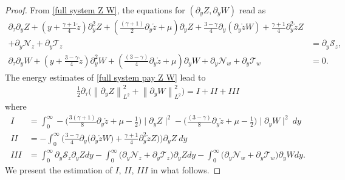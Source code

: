 \documentclass{article}
\newcommand{\norm}[1]{\left\lVert#1\right\rVert}
\newcommand{\ga}{\gamma}
\newcommand{\pa}{\partial}
\def\beqa{\begin{equation}\begin{aligned}}
\def\eeqa{\end{aligned}\end{equation}}
\def\espz{Z}
\def\espw{W}
\def\nz{\mathcal N_z}
\def\nw{\mathcal N_w}
\def\nmz{\mathcal T_z}
\def\nmw{\mathcal T_w}
\numberwithin{equation}{section}
\begin{document}
\begin{proof} 
From \eqref{full system Z W}, the equations for $(\pa_y Z, \pa_y W)$ read as  
	\beqa\label{full system pay Z W}
	\partial_\tau\pa_y \espz + (y+\frac{\ga+1}{4}\mathring z ) \partial_y^{2} \espz + (\frac{(\ga+1)}{2}\partial_y \mathring z+\mu)\pa_y\espz +\frac{3-\ga}{4}\pa_y(\pa_y \mathring z \espw)
    +\frac{\ga+1}{4}\pa_y^2 \mathring z \espz& \\
+\pa_y\nz
+ \pa_y\nmz& = \pa_y\mathcal S_z,\\
		\partial_\tau \pa_y\espw + (y+\frac{3-\ga}{4}\mathring z ) \partial_y^2 \espw + (\frac{(3-\ga)}{4}\pa_y \mathring z+\mu)\pa_y\espw  + \pa_y\nw 
        + \pa_y\nmw & = 0.
\eeqa
The energy estimates of \eqref{full system pay Z W} lead to 
\begin{align*}
    \frac12\pa_\tau\Big(\norm{\pa_y\espz}_{L^2}^2+  \norm{\pa_y\espw}_{L^2}^2\Big) = I+ II + III
\end{align*}
where
\begin{align*}
	I&= \int_{0}^\infty -\Big(\frac{3(\ga+1)}{8}\partial_y \mathring z+\mu-\frac{1}{2} \Big) \mid \pa_y \espz\mid^2 - \Big(\frac{(3-\ga)}{8}\partial_y\mathring z+\mu-\frac{1}{2} \Big) \mid \pa_y \espw\mid^2 \ dy  \\
	II&=-\int_{0}^\infty \Bigg( \frac{3-\ga}{4}\pa_y\Big(\partial_y \mathring z  \espw\Big) +\frac{\ga+1}{4} \pa_y^2 \mathring z  \espz
    \Big)  \Bigg)\pa_y \espz \ dy \\
	III&=  \int_{0}^\infty \pa_y\mathcal S_z \pa_y Z dy- \int_{0}^\infty \Big( \pa_y\nz 
    + \pa_y\nmz \Big) \pa_y Z dy  - \int_{0}^\infty\Big( \pa_y\nw 
    + \pa_y\nmw\Big) \pa_y W dy.
	\end{align*}
    We present the estimation of $I$, $II$, $III$ in what follows. 
    

\end{proof}
\end{document}
